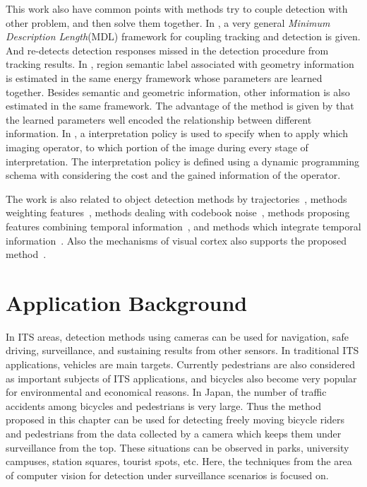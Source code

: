 This work also have common points with methods try to couple detection with other problem, and then solve them together.
In \citep{my7}, a very general \emph{Minimum Description Length}(MDL) framework for
coupling tracking and detection is given. And \citep{ij10} re-detects
detection responses missed in the detection procedure from tracking results. In
\citep{ij14}, region semantic label associated with geometry
information is estimated in the same energy framework whose
parameters are learned together. Besides semantic and geometric information,
other information is also estimated in the same framework. The
advantage of the method is given by that the learned parameters well
encoded the relationship between different information. In
\citep{ij15},  a interpretation policy is used to specify when to
apply which imaging operator, to which portion of the image during
every stage of interpretation. The interpretation policy is defined
using a dynamic programming schema with considering the cost and the
gained information of the operator.



The work is also related to object detection methods by trajectories~\citep{my9,ac24}, methods weighting features~\citep{ij13}, methods dealing with codebook noise~\citep{ac19}, methods proposing features combining temporal information~\citep{stf}, and methods which integrate temporal information~\citep{ac23}. Also the mechanisms of visual cortex also supports the proposed method~\citep{cfm}.


\section{Application Background}
\label{ab4}
In ITS areas, detection methods using cameras can be used for navigation, safe driving, surveillance, and sustaining results from other sensors. In traditional ITS applications, vehicles are main targets. Currently pedestrians are also considered as important subjects of ITS applications, and bicycles also become very popular for environmental and economical reasons. In Japan, the number of traffic accidents among bicycles and pedestrians is very large. Thus the method proposed in this chapter can be used for detecting freely moving bicycle riders and pedestrians from the data collected by a camera which keeps them under surveillance from the top. These situations can be observed in parks, university campuses, station squares, tourist spots, etc.  Here, the techniques from the area of computer vision for detection under surveillance scenarios is focused on.

